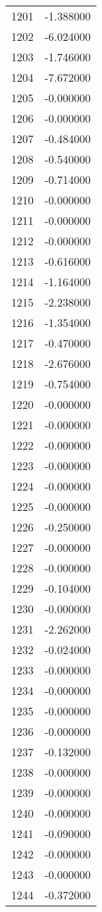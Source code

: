 \documentclass[12pt]{article}
\begin{document}
\begin{longtable}{@{}cc@{}}
1201 & -1.388000 \\
1202 & -6.024000 \\
1203 & -1.746000 \\
1204 & -7.672000 \\
1205 & -0.000000 \\
1206 & -0.000000 \\
1207 & -0.484000 \\
1208 & -0.540000 \\
1209 & -0.714000 \\
1210 & -0.000000 \\
1211 & -0.000000 \\
1212 & -0.000000 \\
1213 & -0.616000 \\
1214 & -1.164000 \\
1215 & -2.238000 \\
1216 & -1.354000 \\
1217 & -0.470000 \\
1218 & -2.676000 \\
1219 & -0.754000 \\
1220 & -0.000000 \\
1221 & -0.000000 \\
1222 & -0.000000 \\
1223 & -0.000000 \\
1224 & -0.000000 \\
1225 & -0.000000 \\
1226 & -0.250000 \\
1227 & -0.000000 \\
1228 & -0.000000 \\
1229 & -0.104000 \\
1230 & -0.000000 \\
1231 & -2.262000 \\
1232 & -0.024000 \\
1233 & -0.000000 \\
1234 & -0.000000 \\
1235 & -0.000000 \\
1236 & -0.000000 \\
1237 & -0.132000 \\
1238 & -0.000000 \\
1239 & -0.000000 \\
1240 & -0.000000 \\
1241 & -0.090000 \\
1242 & -0.000000 \\
1243 & -0.000000 \\
1244 & -0.372000 \\

\end{longtable}
\end{document}
